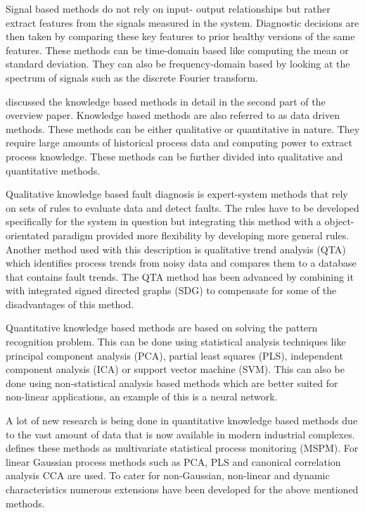Signal based methods do not rely on input- output relationships but rather extract features from the signals measured in the system. Diagnostic decisions are then taken by comparing these key features to prior healthy versions of the same features. These methods can be time-domain based like computing the mean or standard deviation. They can also be frequency-domain based by looking at the spectrum of signals such as the discrete Fourier transform.\par

\cite{cecati2015survey} discussed the knowledge based methods in detail in the second part of the overview paper. Knowledge based methods are also referred to as data driven methods. These methods can be either qualitative or quantitative in nature. They require large amounts of historical process data and computing power to extract process knowledge. These methods can be further divided into qualitative and quantitative methods.\par

Qualitative knowledge based fault diagnosis is expert-system methods that rely on sets of rules to evaluate data and detect faults. The rules have to be developed specifically for the system in question but integrating this method with a object-orientated paradigm provided more flexibility by developing more general rules. Another method used with this description is qualitative trend analysis (QTA) which identifies process trends from noisy data and compares them to a database that contains fault trends. The QTA method has been advanced by combining it with integrated signed directed graphs (SDG) to compensate for some of the disadvantages of this method.\par

Quantitative knowledge based methods are based on solving the pattern recognition problem. This can be done using statistical analysis techniques like principal component analysis (PCA), partial least squares (PLS), independent component analysis (ICA) or support vector machine (SVM). This can also be done using non-statistical analysis based methods which are better suited for non-linear applications, an example of this is a neural network.\par

A lot of new research is being done in quantitative knowledge based methods due to the vast amount of data that is now available in modern industrial complexes. \cite{jiang2019review} defines these methods as multivariate statistical process monitoring (MSPM). For linear Gaussian process methods such as PCA, PLS and canonical correlation analysis CCA are used. To cater for non-Gaussian, non-linear and dynamic characteristics numerous extensions have been developed for the above mentioned methods.\par

